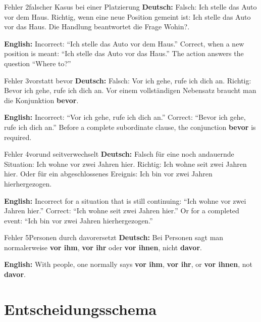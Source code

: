 \documentclass[a4paper,11pt]{article}
\newcommand{\GermanText}[1]{\textbf{Deutsch: }#1\par}
\newcommand{\EnglishText}[1]{{\small\color{SoftGray}\textbf{English: }#1\par}}
\begin{document}
        \begin{grammarentry}{Fehler 2}{falscher Kasus bei einer Platzierung}
            \GermanText{Falsch: \glqq Ich stelle das Auto vor dem Haus.\grqq{} Richtig, wenn eine neue Position gemeint ist: \glqq Ich stelle das Auto vor das Haus.\grqq{} Die Handlung beantwortet die Frage \glqq Wohin?\grqq.}
            \EnglishText{Incorrect: ``Ich stelle das Auto vor dem Haus.'' Correct, when a new position is meant: ``Ich stelle das Auto vor das Haus.'' The action answers the question ``Where to?''}
        \end{grammarentry}

        \begin{grammarentry}{Fehler 3}{\glqq vor\grqq statt \glqq bevor\grqq}
            \GermanText{Falsch: \glqq Vor ich gehe, rufe ich dich an.\grqq{} Richtig: \glqq Bevor ich gehe, rufe ich dich an.\grqq{} Vor einem vollständigen Nebensatz braucht man die Konjunktion \textbf{bevor}.}
            \EnglishText{Incorrect: ``Vor ich gehe, rufe ich dich an.'' Correct: ``Bevor ich gehe, rufe ich dich an.'' Before a complete subordinate clause, the conjunction \textbf{bevor} is required.}
        \end{grammarentry}

        \begin{grammarentry}{Fehler 4}{\glqq vor\grqq und \glqq seit\grqq verwechselt}
            \GermanText{Falsch für eine noch andauernde Situation: \glqq Ich wohne vor zwei Jahren hier.\grqq{} Richtig: \glqq Ich wohne seit zwei Jahren hier.\grqq{} Oder für ein abgeschlossenes Ereignis: \glqq Ich bin vor zwei Jahren hierhergezogen.\grqq}
            \EnglishText{Incorrect for a situation that is still continuing: ``Ich wohne vor zwei Jahren hier.'' Correct: ``Ich wohne seit zwei Jahren hier.'' Or for a completed event: ``Ich bin vor zwei Jahren hierhergezogen.''}
        \end{grammarentry}

        \begin{grammarentry}{Fehler 5}{Personen durch \glqq davor\grqq ersetzt}
            \GermanText{Bei Personen sagt man normalerweise \textbf{vor ihm}, \textbf{vor ihr} oder \textbf{vor ihnen}, nicht \textbf{davor}.}
            \EnglishText{With people, one normally says \textbf{vor ihm}, \textbf{vor ihr}, or \textbf{vor ihnen}, not \textbf{davor}.}
        \end{grammarentry}


    \newpage
    \section{Entscheidungsschema}
\end{document}
